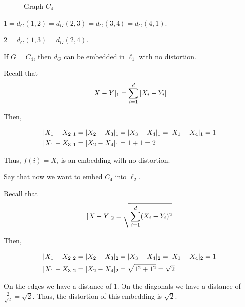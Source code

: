     \begin{figure}[h]
        \centering
        
        \caption{Graph $C_4$}
        \label{fig:c4}
    \end{figure}

    $1 = d_G(1,2) = d_G(2,3) = d_G(3,4) = d_G(4,1)$.

    $2 = d_G(1,3) = d_G(2,4)$.

    If $G = C_4$, then $d_G$ can be embedded in $\ell_1$ with no distortion.

    Recall that
    \[ \vert X-Y \vert_1 = \sum_{i=1}^{d} \vert X_i - Y_i \vert \]

    Then,

    \begin{equation*}
        \begin{split}
            &\vert X_1 - X_2 \vert_1 = \vert X_2 - X_3 \vert_1 = \vert X_3 - X_4 \vert_1 = \vert X_1 - X_4 \vert_1 = 1\\
            &\vert X_1 - X_3 \vert_1 = \vert X_2 - X_4 \vert_1 = 1+1 = 2
        \end{split}
    \end{equation*}

    Thus, $f(i) = X_i$ is an embedding with no distortion.

    Say that now we want to embed $C_4$ into $\ell_2$.

    Recall that
    \[ \vert X-Y \vert_2 = \sqrt{\sum_{i=1}^{d} (X_i - Y_i)^2} \]

    Then,

    \begin{equation*}
        \begin{split}
            &\vert X_1 - X_2 \vert_2 = \vert X_2 - X_3 \vert_2 = \vert X_3 - X_4 \vert_2 = \vert X_1 - X_4 \vert_2 = 1\\
            &\vert X_1 - X_3 \vert_2 = \vert X_2 - X_4 \vert_2 = \sqrt{1^2 + 1^2} = \sqrt{2}
        \end{split}
    \end{equation*}

    On the edges we have a distance of $1$. On the diagonals we have a distance of $\frac{2}{\sqrt{2}} = \sqrt{2}$.
    Thus, the distortion of this embedding is $\sqrt{2}$.

